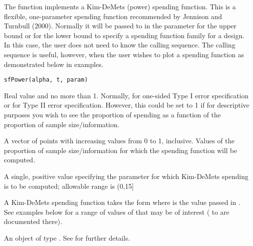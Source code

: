 \begin{Description}\relax
The function  implements a Kim-DeMets (power) spending function.
This is a flexible, one-parameter spending function recommended by Jennison and Turnbull (2000).
Normally it will be passed to  in the parameter  for the upper bound or
 for the lower bound to specify a spending function family for a design.
In this case, the user does not need to know the calling sequence.
The calling sequence is useful, however, when the user wishes to plot a spending function as demonstrated below
in examples.
\end{Description}
\begin{Usage}
\begin{verbatim}
sfPower(alpha, t, param)
\end{verbatim}
\end{Usage}
\begin{Arguments}
\begin{ldescription}
\item[\code{alpha}] Real value  and no more than 1. Normally, 
 for one-sided Type I error specification
or  for Type II error specification. However, this could be set to 1 if for descriptive purposes
you wish to see the proportion of spending as a function of the proportion of sample size/information.
\item[\code{t}] A vector of points with increasing values from 0 to 1, inclusive. Values of the proportion of 
sample size/information for which the spending function will be computed.
\item[\code{param}] A single, positive value specifying the  parameter for which Kim-DeMets spending is to be computed; allowable range is (0,15]
\end{ldescription}
\end{Arguments}
\begin{Details}\relax
A Kim-DeMets spending function takes the form
where  is the value passed in .
See examples below for a range of values of  that may be of interest ( to  are documented there).
\end{Details}
\begin{Value}
An object of type . See  for further details.
\end{Value}
